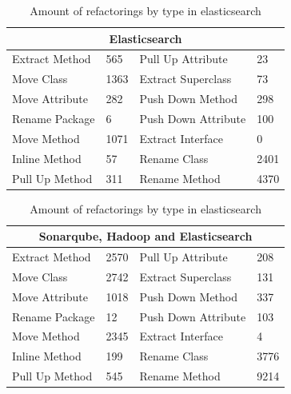 \begin{table}[!ht]
\centering
\begin{tabular}{|l|l|l|l|}
\hline
\multicolumn{4}{|c|}{Elasticsearch} \\ \hline
Extract Method & 565 & Pull Up Attribute & 23 \\ \hline
Move Class & 1363 & Extract Superclass & 73 \\ \hline
Move Attribute & 282 & Push Down Method & 298 \\ \hline
Rename Package & 6 &  Push Down Attribute & 100 \\ \hline
Move Method & 1071 & Extract Interface & 0 \\ \hline
Inline Method & 57 & Rename Class & 2401 \\ \hline
Pull Up Method & 311 & Rename Method & 4370 \\ \hline
\end{tabular}
\caption{Amount of refactorings by type in elasticsearch}
\label{table:11}
\end{table}

\fi

\begin{table}[!ht]
\centering
\begin{tabular}{|l|l|l|l|}
\hline
\multicolumn{4}{|c|}{Sonarqube, Hadoop and Elasticsearch} \\ \hline
Extract Method & 2570 & Pull Up Attribute & 208 \\ \hline
Move Class & 2742 & Extract Superclass & 131 \\ \hline
Move Attribute & 1018 & Push Down Method & 337 \\ \hline
Rename Package & 12 &  Push Down Attribute & 103 \\ \hline
Move Method & 2345 & Extract Interface & 4 \\ \hline
Inline Method & 199 & Rename Class & 3776 \\ \hline
Pull Up Method & 545 & Rename Method & 9214 \\ \hline
\end{tabular}
\caption{Amount of refactorings by type in elasticsearch}
\label{table:9}
\end{table}

